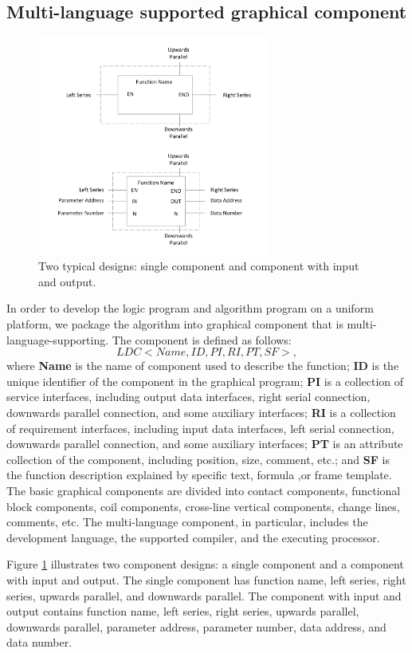 \documentclass[journal,UTF8]{IEEEtran}
\begin{document}
\subsection{Multi-language supported graphical component}
\label{component}
\begin{figure}
	\centering
	\includegraphics[width=3in]{fig/FIG6.pdf}
	\caption{ Two typical designs: single component and component with input and output.}
	\label{fig:Component}
\end{figure}
In order to develop the logic program and algorithm program on a uniform platform, we package the algorithm into graphical component that is multi-language-supporting. The component is defined as follows:
\begin{equation}
LDC<Name,ID,PI,RI,PT,SF>,
\end{equation} 
where \textbf{Name} is the name of component used to describe the function;  \textbf{ID} is the unique identifier of the component in the graphical program; \textbf{PI} is a collection of service interfaces, including output data interfaces, right serial connection, downwards parallel connection, and some auxiliary interfaces; \textbf{RI} is a collection of requirement interfaces, including input data interfaces, left serial connection, downwards parallel connection, and some auxiliary interfaces;  \textbf{PT} is an attribute collection of the component, including position, size, comment, etc.; and \textbf{SF} is the function description explained by specific text, formula ,or frame template. The basic graphical components are divided into contact components, functional block components, coil components, cross-line vertical components, change lines, comments, etc. The multi-language component, in particular, includes the development language, the supported compiler, and the executing processor.

Figure \ref{fig:Component} illustrates two component designs: a single component and a component with input and output. The single component has function name, left series, right series, upwards parallel, and downwards parallel. The component with input and output contains function name, left series, right series, upwards parallel, downwards parallel, parameter address, parameter number, data address, and data number.
\end{document}
